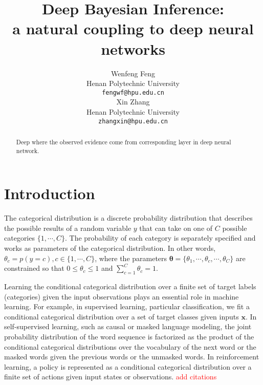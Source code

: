 \documentclass{article}
\title{
  Deep Bayesian Inference: \\ a natural coupling to deep neural networks
}
\author{%
  Wenfeng Feng\\
  Henan Polytechnic University\\
  \texttt{fengwf@hpu.edu.cn} \\
  \And
  Xin Zhang\\
  Henan Polytechnic University\\
  \texttt{zhangxin@hpu.edu.cn} \\
}
\begin{document}
\maketitle


\begin{abstract}
  Deep
  where the observed evidence come from corresponding layer in deep neural network.
\end{abstract}


\section{Introduction}

The categorical distribution is a discrete probability distribution that describes the possible results of a random variable $y$ that can take on one of $C$ possible categories $\{1,\cdots,C\}$.
The probability of each category is separately specified and works as parameters of the categorical distribution.
In other words, $\theta_c = p(y=c), c \in \{1,\cdots,C\}$, where the parameters $\bm{\theta}=\{\theta_1, \cdots, \theta_c, \cdots, \theta_C\}$ are constrained so that $0 \le \theta_c \le 1$ and $\sum_{c=1}^C \theta_c = 1$.

Learning the conditional categorical distribution over a finite set of target labels (categories) given the input observations plays an essential role in machine learning.
For example, in supervised learning, particular classification, we fit a conditional categorical distribution over a set of target classes given inputs $\bm{x}$. %
In self-supervised learning, such as causal or masked language modeling, the joint probability distribution of the word sequence is factorized as the product of the conditional categorical distributions over the vocabulary of the next word or the masked words given the previous words or the unmasked words.
In reinforcement learning, a policy is represented as a conditional categorical distribution over a finite set of actions given input states or observations.
\textcolor{red}{add citations}

\end{document}
